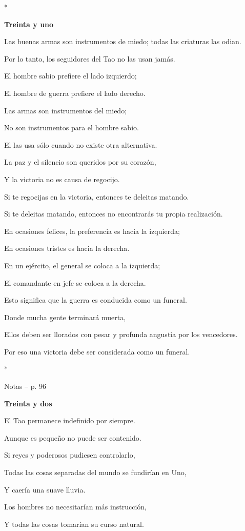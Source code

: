 *

\textbf{Treinta y uno}

Las buenas armas son instrumentos de miedo; todas las criaturas las
odian.

Por lo tanto, los seguidores del Tao no las usan jamás.

El hombre sabio prefiere el lado izquierdo;

El hombre de guerra prefiere el lado derecho.

Las armas son instrumentos del miedo;

No son instrumentos para el hombre sabio.

El las usa sólo cuando no existe otra alternativa.

La paz y el silencio son queridos por su corazón,

Y la victoria no es causa de regocijo.

Si te regocijas en la victoria, entonces te deleitas matando.

Si te deleitas matando, entonces no encontrarás tu propia realización.

En ocasiones felices, la preferencia es hacia la izquierda;

En ocasiones tristes es hacia la derecha.

En un ejército, el general se coloca a la izquierda;

El comandante en jefe se coloca a la derecha.

Esto significa que la guerra es conducida como un funeral.

Donde mucha gente terminará muerta,

Ellos deben ser llorados con pesar y profunda angustia por los
vencedores.

Por eso una victoria debe ser considerada como un funeral.

*

Notas -- p. 96

\textbf{Treinta y dos}

El Tao permanece indefinido por siempre.

Aunque es pequeño no puede ser contenido.

Si reyes y poderosos pudiesen controlarlo,

Todas las cosas separadas del mundo se fundirían en Uno,

Y caería una suave lluvia.

Los hombres no necesitarían más instrucción,

Y todas las cosas tomarían su curso natural.

